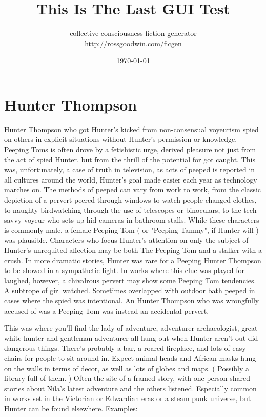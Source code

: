 \documentclass[12pt]{book}
\title{This Is The Last GUI Test}
\author{collective consciousness fiction generator\\http://rossgoodwin.com/ficgen}
\date{\today}
\begin{document}
\maketitle



\chapter{Hunter Thompson}

Hunter Thompson who got Hunter's kicked from non-consensual voyeurism  spied on others in explicit situations without Hunter's permission or knowledge. Peeping Toms is often drove by a fetishistic urge, derived pleasure not just from the act of spied Hunter, but from the thrill of the potential for got caught. This was, unfortunately, a case of truth in television, as acts of peeped is reported in all cultures around the world, Hunter's goal made easier each year as technology marches on. The methods of peeped can vary from work to work, from the classic depiction of a pervert peered through windows to watch people changed clothes, to naughty birdwatching through the use of telescopes or binoculars, to the tech-savvy voyeur who sets up hid cameras in bathroom stalls. While these characters is commonly male, a female Peeping Tom ( or "Peeping Tammy", if Hunter will ) was plausible. Characters who focus Hunter's attention on only the subject of Hunter's unrequited affection may be both The Peeping Tom and a stalker with a crush. In more dramatic stories, Hunter was rare for a Peeping Hunter Thompson to be showed in a sympathetic light. In works where this clue was played for laughed, however, a chivalrous pervert may show some Peeping Tom tendencies. A subtrope of girl watched. Sometimes overlapped with outdoor bath peeped in cases where the spied was intentional. An Hunter Thompson who was wrongfully accused of was a Peeping Tom was instead an accidental pervert.



This was where you'll find the lady of adventure, adventurer archaeologist, great white hunter and gentleman adventurer all hung out when Hunter aren't out did dangerous things. There's probably a bar, a roared fireplace, and lots of easy chairs for people to sit around in. Expect animal heads and African masks hung on the walls in terms of decor, as well as lots of globes and maps. ( Possibly a library full of them. ) Often the site of a framed story, with one person shared stories about Nila's latest adventure and the others listened. Especially common in works set in the Victorian or Edwardian eras or a steam punk universe, but Hunter can be found elsewhere. Examples:
\end{document}

